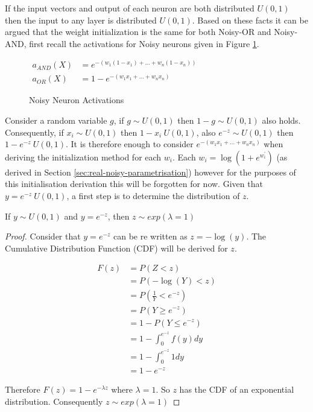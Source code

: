 \noindent
\begin{minipage}[t]{0.55\textwidth}
\vspace{0px}
If the input vectors and output of each neuron are both distributed $U(0,1)$ then the input to any layer is distributed $U(0,1)$. Based on these facts it can be argued that the weight initialization is the same for both Noisy-OR and Noisy-AND, first recall the activations for Noisy neurons given in Figure \ref{fig:recall-noisy-activations}.\\
\end{minipage}
\hspace{0.05\textwidth}
\begin{minipage}[t]{0.4\textwidth}
\vspace{0px}
\begin{figure}[H]
\vspace{0px}
{\centering
$ \displaystyle
\begin{aligned}
a_{AND}(X) &= e^{-(w_1(1 - x_1) + ... + w_n(1 - x_n))}\\
a_{OR}(X) &= 1 - e^{-(w_1x_1 + ... + w_nx_n)}
\end{aligned}
$
\par}
\caption{Noisy Neuron Activations}
\label{fig:recall-noisy-activations}
\end{figure}
\end{minipage}

Consider a random variable $g$, if $g \sim U(0,1)$ then $1 - g \sim U(0,1)$ also holds. Consequently, if $x_i \sim U(0,1)$ then $1 - x_i ~ U(0,1)$, also $e^{-z} \sim U(0,1)$ then $1 - e^{-z} ~ U(0,1)$. It is therefore enough to consider $e^{-(w_1x_1 + ... + w_nx_n)}$ when deriving the initialization method for each $w_i$. Each $w_i = \log(1 + e^{w^{'}_i})$ (as derived in Section \ref{sec:real-noisy-parametrisation}) however for the purposes of this initialisation derivation this will be forgotten for now. Given that $y = e^{-z} ~ U(0,1)$, a first step is to determine the distribution of $z$.\\
\begin{theorem}
	If $y \sim U(0,1)$ and $y = e^{-z}$, then $z \sim exp(\lambda = 1)$
\end{theorem}
\begin{proof}
	Consider that $y = e^{-z}$ can be re written as $z = -\log(y)$. The Cumulative Distribution Function (CDF) will be derived for $z$.
	
	\begin{align*}
	F(z) &= P(Z < z)\\
	&= P(-\log(Y) < z)\\
	&= P(\frac{1}{Y} < e^{-z})\\
	&= P(Y \geq e^{-z})\\
	&= 1 - P(Y \leq e^{-z})\\
	&= 1 - \int_{0}^{e^{-z}} f(y) dy\\
	&= 1 - \int_{0}^{e^{-z}} 1 dy\\
	&= 1 - e^{-z}
	\end{align*}
	
	Therefore $F(z) = 1 - e^{-\lambda z}$ where $\lambda = 1$. So $z$ has the CDF of an exponential distribution. Consequently $z \sim exp(\lambda = 1)$
\end{proof}


